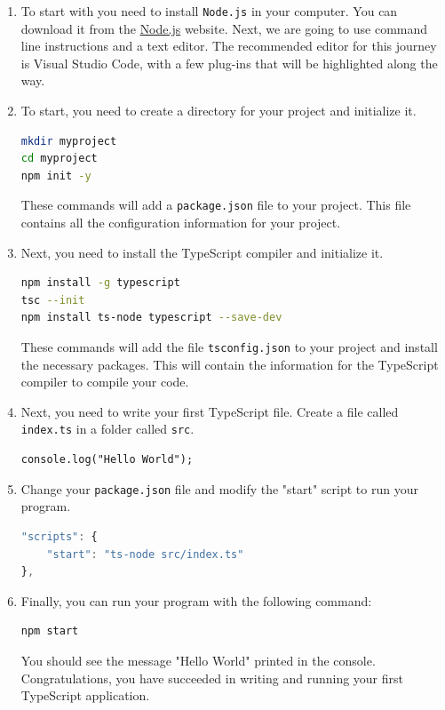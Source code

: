 \documentclass[12pt,a5paper]{memoir}
\begin{document}
\begin{enumerate}

\item 
To start with you need to install \texttt{Node.js} in your computer. You can download it from the
\href{https://nodejs.org}{Node.js} website.
%
Next, we are going to use command line instructions and a text editor. The
recommended editor for this journey is Visual Studio Code, with a few plug-ins
that will be highlighted along the way. 

\item To start, you need to create a directory for your project and initialize
it.

\begin{lstlisting}[language=bash]
mkdir myproject
cd myproject
npm init -y
\end{lstlisting}

These commands will add a \texttt{package.json} file to your project. This file
contains all the configuration information for your project.

\item Next, you need to install the TypeScript compiler and initialize it.

\begin{lstlisting}[language=bash]
npm install -g typescript
tsc --init
npm install ts-node typescript --save-dev
\end{lstlisting}

These commands will add the file \texttt{tsconfig.json} to your project and
install the necessary packages. This will contain the information for the
TypeScript compiler to compile your code.

\item Next, you need to write your first TypeScript file. Create a file called
\texttt{index.ts} in a folder called \texttt{src}.

\begin{lstlisting}
console.log("Hello World");
\end{lstlisting}

\item Change your \texttt{package.json} file and modify the "start" script to run your program.

\begin{lstlisting}[language=JavaScript]
"scripts": {
    "start": "ts-node src/index.ts"
},
\end{lstlisting}

\item Finally, you can run your program with the following command:

\begin{lstlisting}[language=bash]
npm start
\end{lstlisting}

You should see the message "Hello World" printed in the console.
Congratulations, you have succeeded in writing and running your first TypeScript
application.

\end{enumerate}
\end{document}
